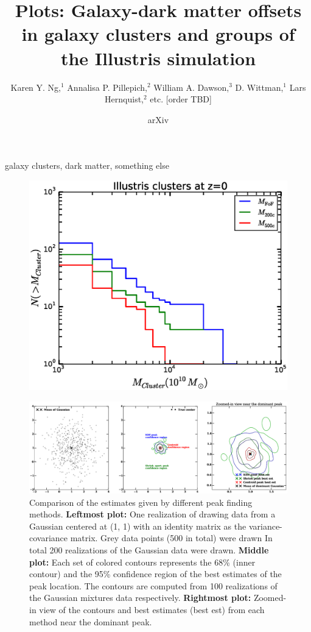 \documentclass[letterpaper,useAMS,usenatbib]{mn2e}
\title[
	Galaxy-dark matter offsets in galaxy clusters and groups of the
Illustris simulation
]
{Plots: Galaxy-dark matter offsets in galaxy clusters and groups of the
Illustris simulation}
\author[Karen Y. Ng et al.]{Karen Y. Ng,$^{1}$
	Annalisa P. Pillepich,$^{2}$ 
	William A. Dawson,$^{3}$ 
	D. Wittman,$^{1}$
	\newauthor Lars Hernquist,$^{2}$
	etc. [order TBD]
}
\begin{document}
\date{arXiv} \pagerange{\pageref{firstpage}--\pageref{lastpage}}
 \maketitle\label{firstpage}
\begin{abstract} 
\end{abstract}
\begin{keywords}
	galaxy clusters, dark matter, something else 
\end{keywords}
\begin{figure}
	\includegraphics[width=.95\linewidth]{clusterMassDist.eps}
	\caption{\label{fig:config}}
\end{figure}
\begin{figure}
	\includegraphics[width=.95\linewidth]{gauss500.eps}
	\caption{Comparison of the estimates given by different peak finding methods.
		{\bf Leftmost plot:} One realization of drawing data from a Gaussian
		centered at (1, 1) with an identity matrix as the variance-covariance
		matrix. Grey data points (500 in total) were drawn 
		In total 200 realizations of the Gaussian data were drawn.
		{\bf Middle plot:} Each set of colored contours represents the
		68\% (inner contour) and the 95\% confidence region of the best estimates
		of the peak location. The contours are computed from 100 realizations of the Gaussian
		mixtures data respectively. {\bf Rightmost plot:} Zoomed-in view of the
		contours and best estimates (best est) from each method near the dominant peak.  
		\label{fig:gaussian500}}
\end{figure}
\end{document}
